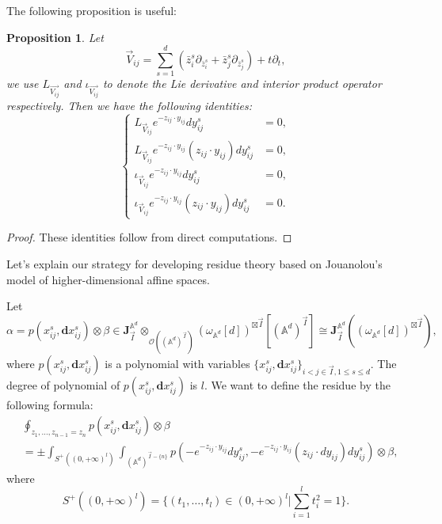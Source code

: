 \documentclass[11pt]{amsart}
\newtheorem{prop}[thm]{Proposition}
\theoremstyle{definition}
\theoremstyle{remark}
\numberwithin{equation}{section}
\begin{document}
The following proposition is useful:
\begin{prop}\label{Lie and interior product}
    Let 
    $$
    \vec{V}_{ij}=\sum_{s=1}^{d}(\bar{z}_i^s\partial_{\bar{z}_{i}^{s}}+\bar{z}_j^s\partial_{\bar{z}_{j}^{s}})+t\partial_{t},
    $$
    we use $L_{\vec{V_{ij}}}$ and $\iota_{\vec{V_{ij}}}$ to denote the Lie derivative and interior product operator respectively. Then we have the following identities:
$$
\left\{
\begin{array}{cc}
     L_{\vec{V}_{ij}}e^{-z_{ij}\cdot y_{ij}}dy_{ij}^s & =0,  \\
      L_{\vec{V}_{ij}}e^{-z_{ij}\cdot y_{ij}}(z_{ij}\cdot y_{ij})dy_{ij}^s & =0,\\
      \iota_{\vec{V}_{ij}}e^{-z_{ij}\cdot y_{ij}}dy_{ij}^s & =0,\\
      \iota_{\vec{V}_{ij}}e^{-z_{ij}\cdot y_{ij}}(z_{ij}\cdot y_{ij})dy_{ij}^s & =0.
\end{array}
\right.
$$
\end{prop}
\begin{proof}
    These identities follow from direct computations.
\end{proof}

Let’s explain our strategy for developing residue theory based on Jouanolou’s model of higher-dimensional affine spaces.

Let
$$
\alpha=p(x_{ij}^{s},\mathbf{d}x_{ij}^{s})\otimes \beta\in \mathbf{J}_{\vec{I}}^{\mathbb{A}^{d}}\otimes_{\mathcal{O}((\mathbb{A}^{d})^{\vec{I}})}(\omega_{\mathbb{A}^{d}}[d])^{\boxtimes\vec{I}}[(\mathbb{A}^{d})^{\vec{I}}]\cong\mathbf{J}_{\vec{I}}^{\mathbb{A}^{d}}((\omega_{\mathbb{A}^{d}}[d])^{\boxtimes\vec{I}}),
$$
where $p(x_{ij}^{s},\mathbf{d}x_{ij}^{s})$ is a polynomial with variables $\{x_{ij}^{s},\mathbf{d}x_{ij}^{s}\}_{i<j\in\vec{I},1\leq s\leq d}$. The degree of polynomial of $p(x_{ij}^{s},\mathbf{d}x_{ij}^{s})$ is $l$. We want to define the residue by the following formula:
\begin{align*}
    &\oint_{z_1,\dots,z_{n-1}=z_n}p(x_{ij}^{s},\mathbf{d}x_{ij}^{s})\otimes \beta\\
    &=\pm\int_{S^{+}((0,+\infty)^l)}\int_{(\mathbb{A}^{d})^{\vec{I}-\{n\}}}p(-e^{-z_{ij}\cdot y_{ij}}dy_{ij}^{s},-e^{-z_{ij}\cdot y_{ij}}(z_{ij}\cdot dy_{ij})dy_{ij}^{s})\otimes \beta,
\end{align*}
where 
$$
S^{+}((0,+\infty)^l)=\{(t_1,\dots,t_{l})\in(0,+\infty)^l|\sum_{i=1}^{l}t_{i}^{2}=1\}.
$$
\end{document}
